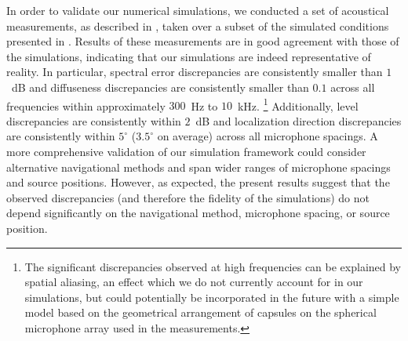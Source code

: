 In order to validate our numerical simulations, we conducted a set of acoustical measurements, as described in , taken over a subset of the simulated conditions presented in .
Results of these measurements are in good agreement with those of the simulations, indicating that our simulations are indeed representative of reality.
In particular, spectral error discrepancies are consistently smaller than $1$~dB and diffuseness discrepancies are consistently smaller than $0.1$ across all frequencies within approximately $300$~Hz to $10$~kHz.%
\footnote{The significant discrepancies observed at high frequencies can be explained by spatial aliasing, an effect which we do not currently account for in our simulations, but could potentially be incorporated in the future with a simple model based on the geometrical arrangement of capsules on the spherical microphone array used in the measurements.}
Additionally, level discrepancies are consistently within $2$~dB and localization direction discrepancies are consistently within $5^\circ$ ($3.5^\circ$ on average) across all microphone spacings.
A more comprehensive validation of our simulation framework could consider alternative navigational methods and span wider ranges of microphone spacings and source positions.
However, as expected, the present results suggest that the observed discrepancies (and therefore the fidelity of the simulations) do not depend significantly on the navigational method, microphone spacing, or source position.